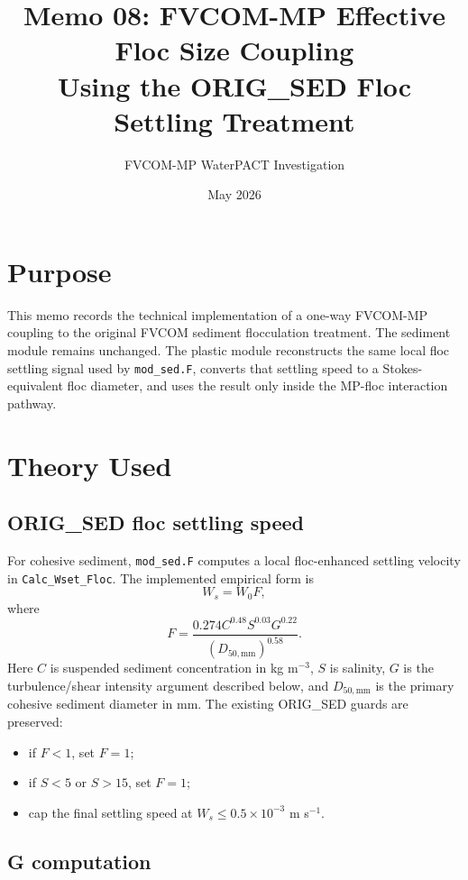 \documentclass[11pt]{article}
\title{Memo 08: FVCOM-MP Effective Floc Size Coupling\\
       Using the ORIG\_SED Floc Settling Treatment}
\author{FVCOM-MP WaterPACT Investigation}
\date{May 2026}
\begin{document}
\sloppy
\maketitle

\section*{Purpose}

This memo records the technical implementation of a one-way FVCOM-MP coupling
to the original FVCOM sediment flocculation treatment.  The sediment module
remains unchanged.  The plastic module reconstructs the same local floc settling
signal used by \texttt{mod\_sed.F}, converts that settling speed to a
Stokes-equivalent floc diameter, and uses the result only inside the MP-floc
interaction pathway.

\section*{Theory Used}

\subsection*{ORIG\_SED floc settling speed}

For cohesive sediment, \texttt{mod\_sed.F} computes a local floc-enhanced
settling velocity in \texttt{Calc\_Wset\_Floc}.  The implemented empirical form
is
\begin{equation}
  W_s = W_0 F,
\end{equation}
where
\begin{equation}
  F =
  \frac{0.274 C^{0.48} S^{0.03} G^{0.22}}
       {(D_{50,\mathrm{mm}})^{0.58}} .
\end{equation}
Here $C$ is suspended sediment concentration in kg m$^{-3}$, $S$ is salinity,
$G$ is the turbulence/shear intensity argument described below, and
$D_{50,\mathrm{mm}}$ is the primary cohesive sediment diameter in mm.  The
existing ORIG\_SED guards are preserved:
\begin{itemize}
  \item if $F < 1$, set $F = 1$;
  \item if $S < 5$ or $S > 15$, set $F = 1$;
  \item cap the final settling speed at $W_s \le 0.5 \times 10^{-3}$ m s$^{-1}$.
\end{itemize}

\subsection*{G computation}
\end{document}
